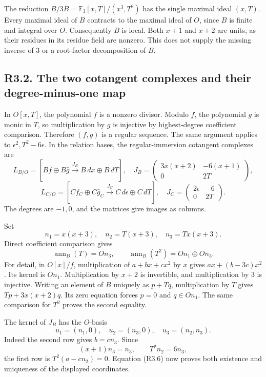 \documentclass[
  10pt,
]{article}
\begin{document}
The reduction \(B/3B=\mathbb F_3[x,T]/(x^3,T^2)\) has the single maximal
ideal \((x,T)\). Every maximal ideal of \(B\) contracts to the maximal
ideal of \(O\), since \(B\) is finite and integral over \(O\).
Consequently \(B\) is local. Both \(x+1\) and \(x+2\) are units, as
their residues in its residue field are nonzero. This does not supply
the missing inverse of 3 or a root-factor decomposition of \(B\).

\subsection{R3.2. The two cotangent complexes and their degree-minus-one
map}\label{r3.2.-the-two-cotangent-complexes-and-their-degree-minus-one-map}

In \(O[x,T]\), the polynomial \(f\) is a nonzero divisor. Modulo \(f\),
the polynomial \(g\) is monic in \(T\), so multiplication by \(g\) is
injective by highest-degree coefficient comparison. Therefore \((f,g)\)
is a regular sequence. The same argument applies to
\(\epsilon^2,T^2-6\epsilon\). In the relation bases, the
regular-immersion cotangent complexes are \[
L_{B/O}=
\left[B\bar f\oplus B\bar g
\xrightarrow{J_B}B\,dx\oplus B\,dT\right],
\quad
J_B=
\begin{pmatrix}3x(x+2)&-6(x+1)\\0&2T\end{pmatrix},
\] \[
L_{C/O}=
\left[C\bar f_C\oplus C\bar g_C
\xrightarrow{J_C}C\,d\epsilon\oplus C\,dT\right],
\quad
J_C=
\begin{pmatrix}2\epsilon&-6\\0&2T\end{pmatrix}.
\tag{R3.5}
\] The degrees are \(-1,0\), and the matrices give images as columns.

Set \[
n_1=x(x+3),\quad n_2=T(x+3),\quad n_3=Tx(x+3).
\] Direct coefficient comparison gives \[
\operatorname{ann}_B(T)=On_3,\qquad
\operatorname{ann}_B(T^2)=On_1\oplus On_3.
\tag{R3.6}
\] For detail, in \(O[x]/f\), multiplication of \(a+bx+cx^2\) by \(x\)
gives \(ax+(b-3c)x^2\). Its kernel is \(On_1\). Multiplication by
\(x+2\) is invertible, and multiplication by 3 is injective. Writing an
element of \(B\) uniquely as \(p+Tq\), multiplication by \(T\) gives
\(Tp+3x(x+2)q\). Its zero equation forces \(p=0\) and \(q\in On_1\). The
same comparison for \(T^2\) proves the second equality.

The kernel of \(J_B\) has the \(O\)-basis \[
u_1=(n_1,0),\quad u_2=(n_3,0),\quad u_3=(n_2,n_3).
\tag{R3.7}
\] Indeed the second row gives \(b=cn_3\). Since \[
(x+1)n_3=n_3,\qquad T^2n_2=6n_3,
\] the first row is \(T^2(a-cn_2)=0\). Equation (R3.6) now proves both
existence and uniqueness of the displayed coordinates.
\end{document}
